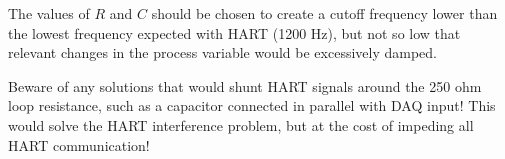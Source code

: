 The values of $R$ and $C$ should be chosen to create a cutoff frequency lower than the lowest frequency expected with HART (1200 Hz), but not so low that relevant changes in the process variable would be excessively damped.

\vskip 10pt

Beware of any solutions that would shunt HART signals around the 250 ohm loop resistance, such as a capacitor connected in parallel with DAQ input!  This would solve the HART interference problem, but at the cost of impeding all HART communication!




